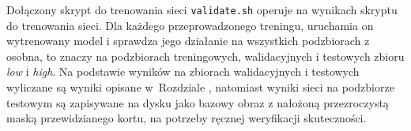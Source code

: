 Dołączony skrypt do trenowania sieci \texttt{validate.sh} operuje na wynikach skryptu do trenowania sieci. Dla każdego przeprowadzonego treningu, uruchamia on wytrenowany model i sprawdza jego działanie na wszystkich podzbiorach z osobna, to znaczy na podzbiorach treningowych, walidacyjnych i testowych zbioru \textit{low} i \textit{high}. Na podstawie wyników na zbiorach walidacyjnych i testowych wyliczane są wyniki opisane w~Rozdziale , natomiast wyniki sieci na podzbiorze testowym są zapisywane na dysku jako bazowy obraz z nałożoną przezroczystą maską przewidzianego kortu, na potrzeby ręcznej weryfikacji skuteczności.
